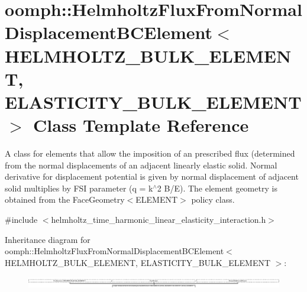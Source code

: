\hypertarget{classoomph_1_1HelmholtzFluxFromNormalDisplacementBCElement}{}\section{oomph\+:\+:Helmholtz\+Flux\+From\+Normal\+Displacement\+B\+C\+Element$<$ H\+E\+L\+M\+H\+O\+L\+T\+Z\+\_\+\+B\+U\+L\+K\+\_\+\+E\+L\+E\+M\+E\+NT, E\+L\+A\+S\+T\+I\+C\+I\+T\+Y\+\_\+\+B\+U\+L\+K\+\_\+\+E\+L\+E\+M\+E\+NT $>$ Class Template Reference}
\label{classoomph_1_1HelmholtzFluxFromNormalDisplacementBCElement}


A class for elements that allow the imposition of an prescribed flux (determined from the normal displacements of an adjacent linearly elastic solid. Normal derivative for displacement potential is given by normal displacement of adjacent solid multiplies by F\+SI parameter (q = k$^\wedge$2 B/E). The element geometry is obtained from the Face\+Geometry$<$\+E\+L\+E\+M\+E\+N\+T$>$ policy class.  




{\ttfamily \#include $<$helmholtz\+\_\+time\+\_\+harmonic\+\_\+linear\+\_\+elasticity\+\_\+interaction.\+h$>$}

Inheritance diagram for oomph\+:\+:Helmholtz\+Flux\+From\+Normal\+Displacement\+B\+C\+Element$<$ H\+E\+L\+M\+H\+O\+L\+T\+Z\+\_\+\+B\+U\+L\+K\+\_\+\+E\+L\+E\+M\+E\+NT, E\+L\+A\+S\+T\+I\+C\+I\+T\+Y\+\_\+\+B\+U\+L\+K\+\_\+\+E\+L\+E\+M\+E\+NT $>$\+:\begin{figure}[H]
\begin{center}
\leavevmode
\includegraphics[height=0.510018cm]{classoomph_1_1HelmholtzFluxFromNormalDisplacementBCElement}
\end{center}
\end{figure}
